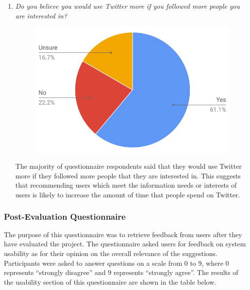 \documentclass{l4proj}
\begin{document}
\begin{enumerate}
\item \textit{Do you believe you would use Twitter more if you followed more people you are interested in?}
\par
\begin{figure}[H]
\centering
\includegraphics[scale=0.55]{usetwittermore.png}
\label{usetwittermore}
\end{figure}
The majority of questionnaire respondents said that they would use Twitter more if they followed more people that they are interested in. This suggests that recommending users which meet the information needs or interests of users is likely to increase the amount of time that people spend on Twitter.

\end{enumerate}
               
        \subsubsection{Post-Evaluation Questionnaire}
        The purpose of this questionnaire was to retrieve feedback from users after they have evaluated the project. The questionnaire asked users for feedback on system usability as for their opinion on the overall relevance of the suggestions. Participants were asked to answer questions on a scale from 0 to 9, where 0 represents ``strongly disagree'' and 9 represents ``strongly agree''. The results of the usability section of this questionnaire are shown in the table below.
        
\end{document}
